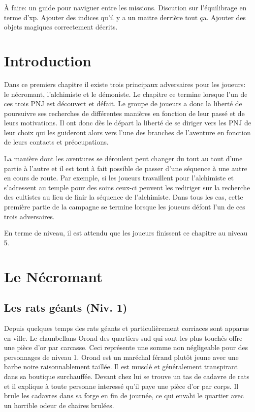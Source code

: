 
À faire: un guide pour naviguer entre les missions.
Discution sur l'équilibrage en terme d'xp.
Ajouter des indices qu'il y a un maitre derrière tout ça.
Ajouter des objets magiques correctement décrits.

\section{Introduction}

Dans ce premiers chapitre il existe trois principaux adversaires pour les joueurs: le nécromant, 
l'alchimiste et le démoniste. Le chapitre ce termine lorsque l'un de ces trois PNJ est découvert et 
défait. Le groupe de joueurs a donc la liberté de poursuivre ses recherches de différentes manières 
en fonction de leur passé et de leurs motivations. Il ont donc dès le départ la liberté de se diriger
vers les PNJ de leur choix qui les guideront alors vers l'une des branches de l'aventure en fonction 
de leurs contacts et préocupations. 

La manière dont les aventures se déroulent peut changer du tout au tout d'une partie à l'autre et il
est tout à fait possible de passer d'une séquence à une autre en cours de route. Par
exemple, si les joueurs travaillent pour l'alchimiste et s'adressent au temple pour des soins ceux-ci 
peuvent les rediriger sur la recherche des cultistes au lieu de finir la séquence de l'alchimiste. Dans 
tous les cas, cette première partie de la campagne se termine lorsque les joueurs défont l'un de ces trois
adversaires.

En terme de niveau, il est attendu que les joueurs finissent ce chapitre au niveau 5.


\section{Le Nécromant}
\subsection{Les rats géants (Niv. 1)}
\label{ss:RatsGeants}

Depuis quelques temps des rats géants et particulièrement corriaces sont apparus en ville. Le chambellans 
Orond des quartiers sud qui sont les plus touchés offre une pièce d'or par carcasse. Ceci représente une
somme non négligeable pour des personnages de niveau 1. Orond est un maréchal férand plutôt jeune avec une 
barbe noire raisonnablement taillée. Il est musclé et généralement transpirant dans sa boutique surchauffée.
Devant chez lui se trouve un tas de cadavre de rats et il explique à toute personne interessé qu'il paye
une pièce d'or par corps. Il brule les cadavres dans sa forge en fin de journée, ce qui envahi le quartier
avec un horrible odeur de chaires brulées.

